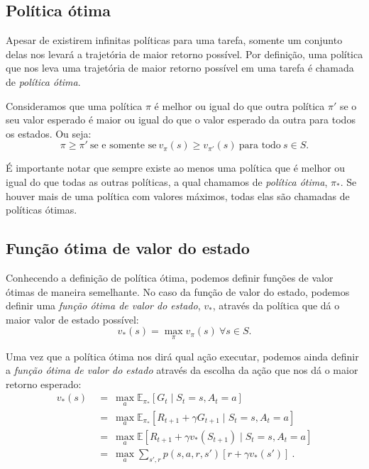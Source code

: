 \documentclass{article}
\begin{document}
        \subsection{Política ótima}
        
            Apesar de existirem infinitas políticas para uma tarefa, somente um conjunto delas nos levará a trajetória de maior retorno possível. Por definição, uma política que nos leva uma trajetória de maior retorno possível em uma tarefa é chamada de \emph{política ótima}.

            Consideramos que uma política $\pi$ é melhor ou igual do que outra política $\pi'$ se o seu valor esperado é maior ou igual do que o valor esperado da outra para todos os estados. Ou seja:
            \begin{equation*}
                \pi \geq \pi'\ \text{se e somente se}\ v_{\pi}(s) \geq v_{\pi'}(s)\ \text{para todo}\ s \in S.
            \end{equation*}
            
            É importante notar que sempre existe ao menos uma política que é melhor ou igual do que todas as outras políticas, a qual chamamos de \emph{política ótima}, $\pi_*$. Se houver mais de uma política com valores máximos, todas elas são chamadas de políticas ótimas.
        
        \subsection{Função ótima de valor do estado}
        
            Conhecendo a definição de política ótima, podemos definir funções de valor ótimas de maneira semelhante. No caso da função de valor do estado, podemos definir uma \emph{função ótima de valor do estado}, $v_*$, através da política que dá o maior valor de estado possível:
            \begin{equation}
                v_*(s) = \max_{\pi} v_{\pi}(s)\ \forall s \in S.
            \end{equation}

            Uma vez que a política ótima nos dirá qual ação executar, podemos ainda definir a \emph{função ótima de valor do estado} através da escolha da ação que nos dá o maior retorno esperado:
            \begin{equation}
            \label{eq:optimal-state-value}
            \begin{split}
                v_*(s) & \ = \ \max_{a} \mathbb{E}_{\pi_*} [G_t \mid S_t = s, A_t = a] \\
                & \ = \ \max_{a} \mathbb{E}_{\pi_*} [R_{t+1} + \gamma G_{t+1} \mid S_t = s, A_t = a] \\
                & \ = \ \max_{a} \mathbb{E} [R_{t+1} + \gamma v_*(S_{t+1}) \mid S_t = s, A_t = a] \\
                & \ = \ \max_{a} \sum_{s', r} p(s, a, r, s') [r + \gamma v_*(s')]\ .
            \end{split}
            \end{equation}
\end{document}
